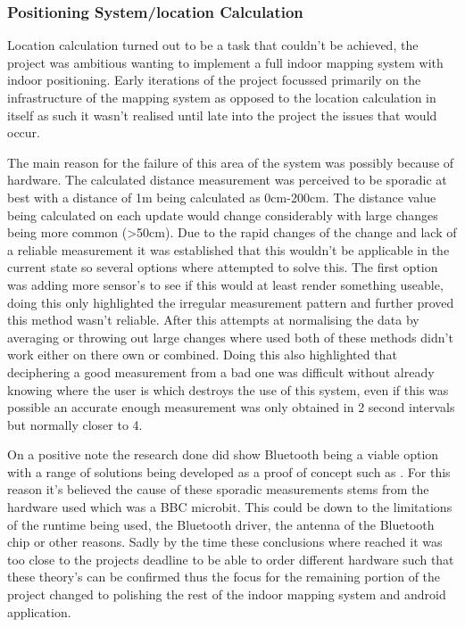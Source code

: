 \subsubsection{Positioning System/location Calculation}
Location calculation turned out to be a task that couldn't be achieved, the project was ambitious wanting to implement a full indoor mapping system with indoor positioning. Early iterations of the project focussed primarily on the infrastructure of the mapping system as opposed to the location calculation in itself as such it wasn't realised until late into the project the issues that would occur.

The main reason for the failure of this area of the system was possibly because of hardware. The calculated distance measurement was perceived to be sporadic at best with a distance of 1m being calculated as 0cm-200cm. The distance value being calculated on each update would change considerably with large changes being more common (>50cm). Due to the rapid changes of the change and lack of a reliable measurement it was established that this wouldn't be applicable in the current state so several options where attempted to solve this. The first option was adding more sensor's to see if this would at least render something useable, doing this only highlighted the irregular measurement pattern and further proved this method wasn't reliable.
After this attempts at normalising the data by averaging or throwing out large changes where used both of these methods didn't work either on there own or combined. Doing this also highlighted that deciphering a good measurement from a bad one was difficult without already knowing where the user is which destroys the use of this system, even if this was possible an accurate enough measurement was only obtained in 2 second intervals but normally closer to 4.

On a positive note the research done did show Bluetooth being a viable option with a range of solutions being developed as a proof of concept such as \citetemp. For this reason it's believed the cause of these sporadic measurements stems from the hardware used which was a BBC microbit. This could be down to the limitations of the runtime being used, the Bluetooth driver, the antenna of the Bluetooth chip or other reasons. Sadly by the time these conclusions where reached it was too close to the projects deadline to be able to order different hardware such that these theory's can be confirmed thus the focus for the remaining portion of the project changed to polishing the rest of the indoor mapping system and android application.

